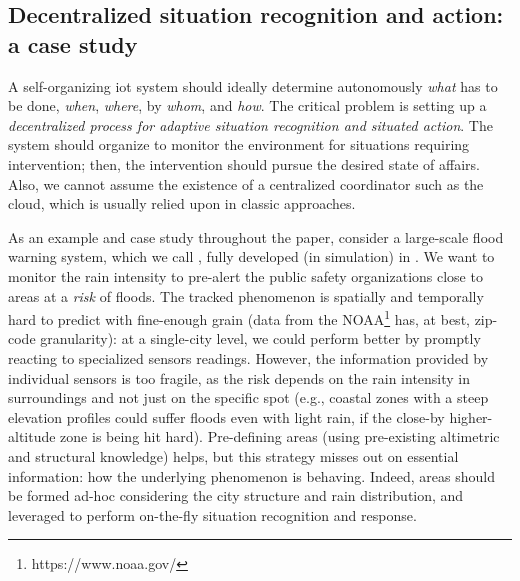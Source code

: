 \subsection{Decentralized situation recognition and action: a case study}
\label{decentralized-sr}


A self-organizing \ac{iot} system
 should ideally determine autonomously
 \emph{what} has to be done,
 \emph{when},
 \emph{where},
 by \emph{whom},
 and \emph{how}.
%
The critical problem is setting up 
a \emph{decentralized process
for adaptive situation recognition
and situated action}.
%
The system 
 should organize to
 monitor the environment
 for situations
 requiring intervention;
 then, 
 the intervention should
 pursue
 the desired state of affairs.
%
%
%
Also,
we cannot assume the existence of a centralized coordinator
 such as the cloud,
which is usually relied upon in classic approaches.
 
As an example and case study throughout the paper,
consider a large-scale flood warning system,
which we call \casename{},
fully developed (in simulation) in .
%
We want to monitor the rain intensity to pre-alert the public safety organizations close to areas at a \emph{risk} of floods.
%
The tracked phenomenon is spatially and temporally hard to predict with fine-enough grain
(data from the NOAA\footnote{https://www.noaa.gov/} has, at best, zip-code granularity):
at a single-city level,
we could perform better by promptly reacting to specialized sensors readings.
%
However, the information provided by individual sensors is too fragile,
as the risk depends on the rain intensity in surroundings and not just on the specific spot
(e.g., coastal zones with a steep elevation profiles could suffer floods even with light rain,
if the close-by higher-altitude zone is being hit hard).
%
Pre-defining areas
(using pre-existing altimetric and structural knowledge)
helps, but this strategy misses out on essential information:
how the underlying phenomenon is behaving.
%
Indeed, areas should be formed ad-hoc considering the city structure and rain distribution,
and leveraged to perform on-the-fly situation recognition and response.

